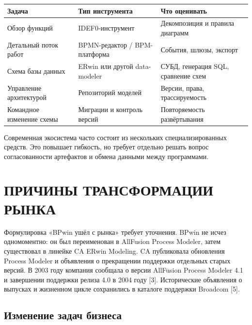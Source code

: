 \documentclass[essaypaper,paper]{pmk-graduate}
\begin{document}
\begin{longtable}{|p{}|p{}|p{}|}

\hline

\textbf{Задача} & \textbf{Тип инструмента} & \textbf{Что оценивать} \\ \hline

Обзор функций & IDEF0-инструмент & Декомпозиция и правила диаграмм \\ \hline

Детальный поток работ & BPMN-редактор / BPM-платформа & События, шлюзы, экспорт \\ \hline

Схема базы данных & ERwin или другой data-modeler & СУБД, генерация SQL, сравнение схем \\ \hline

Управление архитектурой & Репозиторий моделей & Версии, права, трассируемость \\ \hline

Командное изменение схемы & Миграции и контроль версий & Повторяемость развёртывания \\ \hline

\end{longtable}

\normalsize

Современная экосистема часто состоит из нескольких специализированных средств. Это повышает гибкость, но требует отдельно решать вопрос согласованности артефактов и обмена данными между программами.

\par

\chapter{ПРИЧИНЫ ТРАНСФОРМАЦИИ РЫНКА}

Формулировка «BPwin ушёл с рынка» требует уточнения. BPwin не исчез одномоментно: он был переименован в AllFusion Process Modeler, затем существовал в линейке CA ERwin Modeling. CA публиковала обновления Process Modeler и объявления о прекращении поддержки отдельных старых версий. В 2003 году компания сообщала о версии AllFusion Process Modeler 4.1 и завершении поддержки релиза 4.0 в 2004 году [3]. Исторические объявления о выпусках и жизненном цикле сохранились в каталоге поддержки Broadcom [5].

\par

\section{Изменение задач бизнеса}
\end{document}
